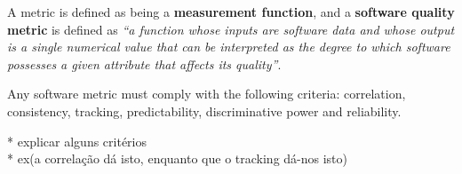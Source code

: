 \par A metric is defined as being a {\bf measurement function}, and a {\bf software quality metric} is defined as \emph{``a function whose inputs are software data and whose output is a single numerical value that can be interpreted as the degree to which software possesses a given attribute that affects its quality''}.

\par Any software metric must comply with the following criteria: correlation, consistency, tracking, predictability, discriminative power and reliability.


* explicar alguns critérios\\
* ex(a correlação dá isto, enquanto que o tracking dá-nos isto)\\